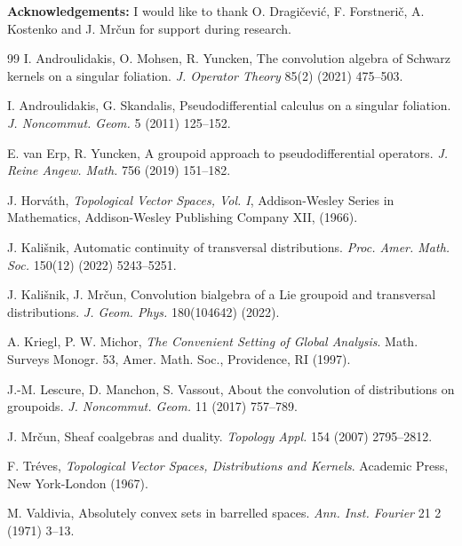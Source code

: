 \documentclass[a4paper]{amsart}
\begin{document}
\noindent
{\bf Acknowledgements:} 
I would like to thank O. Dragičević, F. Forstnerič, A. Kostenko and J. Mrčun for support during research. 

\begin{thebibliography}{99}
   I. Androulidakis, O. Mohsen, R. Yuncken,
					 The convolution algebra of Schwarz kernels on a singular foliation.
					 {\em J. Operator Theory} 85(2) (2021) 475--503.

     I. Androulidakis, G. Skandalis,
					 Pseudodifferential calculus on a singular foliation.
					 {\em J. Noncommut. Geom.} 5 (2011) 125--152.	 
					 
     E. van Erp, R. Yuncken,
					 A groupoid approach to pseudodifferential operators.
					 {\em J. Reine Angew. Math.} 756 (2019) 151--182.
					 
		 J. Horv\'{a}th,
					 {\em Topological Vector Spaces, Vol. I},
					 Addison-Wesley Series in Mathematics,
					 Addison-Wesley Publishing Company XII, (1966).
					 					 
      J. Kali\v{s}nik,
                     Automatic continuity of transversal distributions.
                     {\em Proc. Amer. Math. Soc.} 150(12) (2022) 5243--5251.
                     
     J. Kali\v{s}nik, J. Mr\v{c}un,
					 Convolution bialgebra of a Lie groupoid and transversal distributions.
					 {\em J. Geom. Phys.} 180(104642) (2022).

     A. Kriegl, P. W. Michor,
                     {\em The Convenient Setting of Global Analysis}.
                     Math. Surveys Monogr. 53,
                     Amer. Math. Soc.,
                     Providence, RI (1997).
                     
   J.-M. Lescure, D. Manchon, S. Vassout,
                     About the convolution of distributions on groupoids.
                     {\em J. Noncommut. Geom.} 11 (2017) 757--789.    
                     
      J. Mr\v{c}un,
                     Sheaf coalgebras and duality.
                     {\em Topology Appl.} 154 (2007) 2795--2812.                                 
                    
		 F. Tr\'{e}ves,
				     {\em Topological Vector Spaces, Distributions and Kernels}.
				     Academic Press,
				     New York-London (1967).
				     
      M. Valdivia,
                     Absolutely convex sets in barrelled spaces.
                     {\em Ann. Inst. Fourier} 21 2 (1971) 3--13.     
\end{thebibliography}
\end{document}
